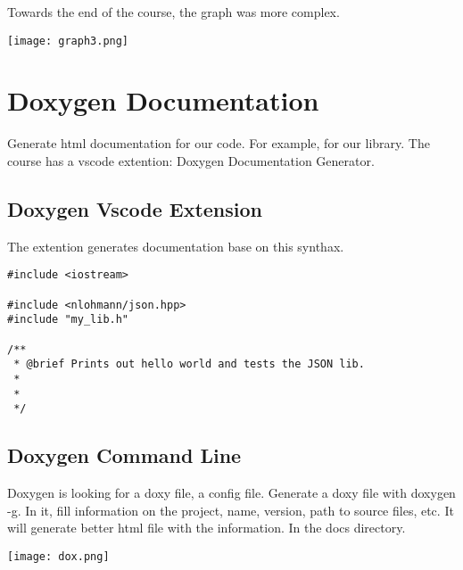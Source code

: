 Towards the end of the course, the graph was more complex.

\begin{center}
    \texttt{[image: graph3.png]}
\end{center}

\section{Doxygen Documentation}

Generate html documentation for our code. For example, for our library. The course has a vscode extention: Doxygen Documentation Generator.

\subsection{Doxygen Vscode Extension}

The extention generates documentation base on this synthax.

\begin{verbatim}
#include <iostream>

#include <nlohmann/json.hpp>
#include "my_lib.h"

/**
 * @brief Prints out hello world and tests the JSON lib.
 *
 *
 */
\end{verbatim}

\subsection{Doxygen Command Line}

Doxygen is looking for a doxy file, a config file. Generate a doxy file with doxygen -g.
In it, fill information on the project, name, version,  path to source files, etc. It will generate better html file with the information.
In the docs directory.

\begin{center}
    \texttt{[image: dox.png]}
\end{center}

